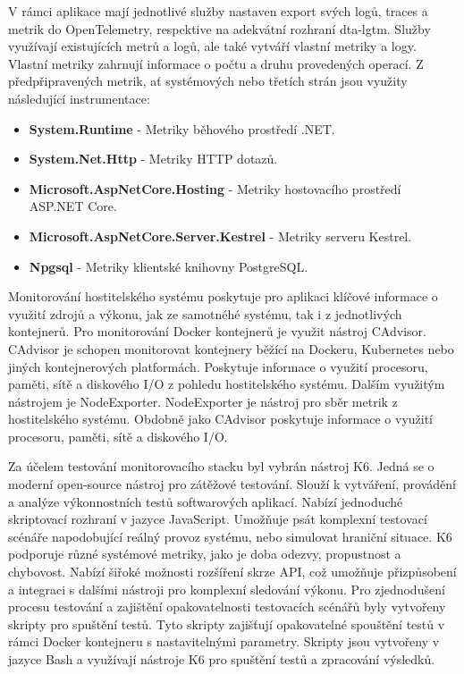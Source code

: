 V rámci aplikace mají jednotlivé služby nastaven export svých logů, traces a metrik do OpenTelemetry, respektive na adekvátní rozhraní dta-lgtm. Služby využívají existujících metrů a logů, ale také vytváří vlastní metriky a logy. Vlastní metriky zahrnují informace o počtu a druhu provedených operací. Z předpřipravených metrik, ať systémových nebo třetích strán jsou využity následující instrumentace:

\begin{itemize}
  \item \textbf{System.Runtime} - Metriky běhového prostředí .NET.
  \item \textbf{System.Net.Http} - Metriky HTTP dotazů.
  \item \textbf{Microsoft.AspNetCore.Hosting} - Metriky hostovacího prostředí ASP.NET Core.
  \item \textbf{Microsoft.AspNetCore.Server.Kestrel} - Metriky serveru Kestrel.
  \item \textbf{Npgsql} - Metriky klientské knihovny PostgreSQL.
\end{itemize}


Monitorování hostitelského systému poskytuje pro aplikaci klíčové informace o využití zdrojů a výkonu, jak ze samotnéhé systému, tak i z jednotlivých kontejnerů. Pro monitorování Docker kontejnerů je využit nástroj CAdvisor. CAdvisor je schopen monitorovat kontejnery běžící na Dockeru, Kubernetes nebo jiných kontejnerových platformách. Poskytuje informace o využití procesoru, paměti, sítě a diskového I/O z pohledu hostitelského systému. Dalším využitým nástrojem je NodeExporter. NodeExporter je nástroj pro sběr metrik z hostitelského systému. Obdobně jako CAdvisor poskytuje informace o využití procesoru, paměti, sítě a diskového I/O.


Za účelem testování monitorovacího stacku byl vybrán nástroj K6. Jedná se o moderní open-source nástroj pro zátěžové testování. Slouží k vytváření, provádění a analýze výkonnostních testů softwarových aplikací. Nabízí jednoduché skriptovací rozhraní v jazyce JavaScript. Umožňuje psát komplexní testovací scénáře napodobující reálný provoz systému, nebo simulovat hraniční situace. K6 podporuje různé systémové metriky, jako je doba odezvy, propustnost a chybovost. Nabízí šiřoké možnosti rozšíření skrze API, což umožňuje přizpůsobení a integraci s dalšími nástroji pro komplexní sledování výkonu. Pro zjednodušení procesu testování a zajištění opakovatelnosti testovacích scénářů byly vytvořeny skripty pro spuštění testů. Tyto skripty zajišťují opakovatelné spouštění testů v rámci Docker kontejneru s nastavitelnými parametry. Skripty jsou vytvořeny v jazyce Bash a využívají nástroje K6 pro spuštění testů a zpracování výsledků.

